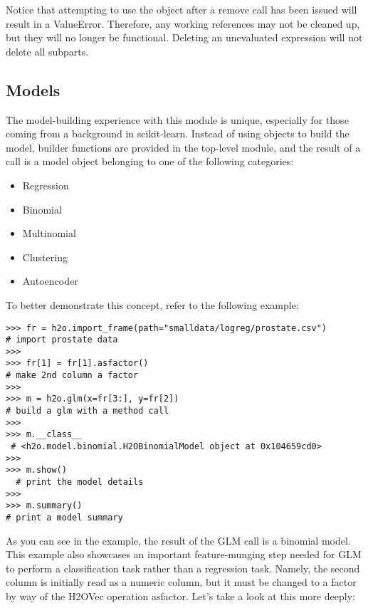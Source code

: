 Notice that attempting to use the object after a remove call has been issued will result in a ValueError. Therefore, any working references may not be cleaned up, but they will no longer be functional. Deleting an unevaluated expression will not delete all subparts.

\subsection{Models}

The model-building experience with this module is unique, especially for those coming from a background in scikit-learn. Instead of using objects to build the model, builder functions are provided in the top-level module, and the result of a call is a model object belonging to one of the following categories:

\begin{itemize}
\item Regression
\item Binomial
\item Multinomial
\item Clustering
\item Autoencoder
\end{itemize}

To better demonstrate this concept, refer to the following example:
\begin{lstlisting}[style=python]
>>> fr = h2o.import_frame(path="smalldata/logreg/prostate.csv")  
# import prostate data
>>>
>>> fr[1] = fr[1].asfactor()                                     
# make 2nd column a factor
>>>
>>> m = h2o.glm(x=fr[3:], y=fr[2])                               
# build a glm with a method call
>>>
>>> m.__class__                                                 
 # <h2o.model.binomial.H2OBinomialModel object at 0x104659cd0>
>>>
>>> m.show()                                                   
  # print the model details
>>>
>>> m.summary()                                                  
# print a model summary
\end{lstlisting}


As you can see in the example, the result of the GLM call is a binomial model. This example also showcases an important feature-munging step needed for GLM to perform a classification task rather than a regression task. Namely, the second column is initially read as a numeric column, but it must be changed to a factor by way of the H2OVec operation asfactor. Let's take a look at this more deeply:


